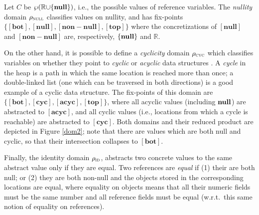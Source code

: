 \documentclass[prodmode,acmtocl]{acmsmall}
\def\rvalues{\ensuremath{\mathbb{R}}\xspace}
\def\uco{\ensuremath{\rho}\xspace}
\newcommand{\nil}{\mbox{\bf null}}
\newcommand{\0}{\mbox{\bf 0}}
\def\IDDOM{\ensuremath{\uco_{\textsc{id}}}\xspace}
\def\TOP{\ABSVAL{top}}
\def\BOT{\ABSVAL{bot}}
\def\NULLDOM{\ensuremath{\uco_{\textsc{null}}}\xspace}
\def\NULL{\ABSVAL{null}}
\def\NONNULL{\ABSVAL{non{-}null}}
\def\CYCLEDOM{\ensuremath{\uco_{\textsc{cyc}}}\xspace}
\def\CYCLIC{\ABSVAL{cyc}}
\def\ACYCLIC{\ABSVAL{acyc}}
\newcommand{\ABSVAL}[1]{\left[\mathbf{#1}\right]}
\begin{document}
\begin{example}
  \label{ex:referenceAbstractDomains}
  Let $C$ be $\wp(\rvalues{\cup}\{\nil\})$, i.e., the possible values
  of reference variables.  The \emph{nullity} domain $\NULLDOM$
  classifies values on nullity, and has fix-points $\{ \BOT, \NULL,
  \NONNULL, \TOP \}$ where the concretizations of $\NULL$ and
  $\NONNULL$ are, respectively, $\{ \nil \}$ and $\rvalues$.
  
  On the other hand, it is possible to define a \emph{cyclicity}
  domain $\CYCLEDOM$ which classifies variables on whether they point
  to \emph{cyclic} or \emph{acyclic} data structures \cite{tcs13}.  A
  \emph{cycle} in the heap is a path in which the same location is
  reached more than once; a double-linked list (one which can be
  traversed in both directions) is a good example of a cyclic data
  structure.  The fix-points of this domain are $\{ \BOT, \CYCLIC,
  \ACYCLIC, \TOP \}$, where all acyclic values (including $\nil$) are
  abstracted to $\ACYCLIC$, and all cyclic values (i.e., locations
  from which a cycle is reachable) are abstracted to $\CYCLIC$.  Both
  domains and their reduced product are depicted in Figure \ref{dom2};
  note that there are values which are both null and cyclic, so that
  their intersection collapses to $\BOT$.
  
  Finally, the identity domain $\IDDOM$, abstracts two concrete values
  to the same abstract value only if they are equal.  Two references
  are \emph{equal} if (1) their are both null; or (2) they are both
  non-null and the objects stored in the corresponding locations are
  equal, where equality on objects means that all their numeric fields
  must be the same number and all reference fields must be equal
  (w.r.t.~this same notion of equality on references).

  \begin{figure}[h]
    \begin{center}
\end{center}
\end{figure}
\end{example}
\end{document}
